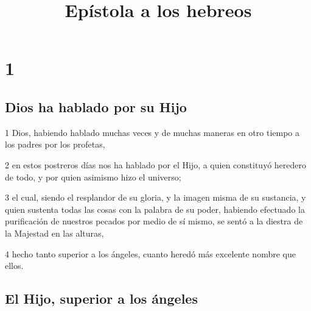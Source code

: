 
\title{Epístola a los hebreos}

\chapter{1}

\section*{Dios ha hablado por su Hijo}

\par 1 Dios, habiendo hablado muchas veces y de muchas maneras en otro tiempo a los padres por los profetas,
\par 2 en estos postreros días nos ha hablado por el Hijo, a quien constituyó heredero de todo, y por quien asimismo hizo el universo;
\par 3 el cual, siendo el resplandor de su gloria, y la imagen misma de su sustancia, y quien sustenta todas las cosas con la palabra de su poder, habiendo efectuado la purificación de nuestros pecados por medio de sí mismo, se sentó a la diestra de la Majestad en las alturas,
\par 4 hecho tanto superior a los ángeles, cuanto heredó más excelente nombre que ellos.

\section*{El Hijo, superior a los ángeles}

